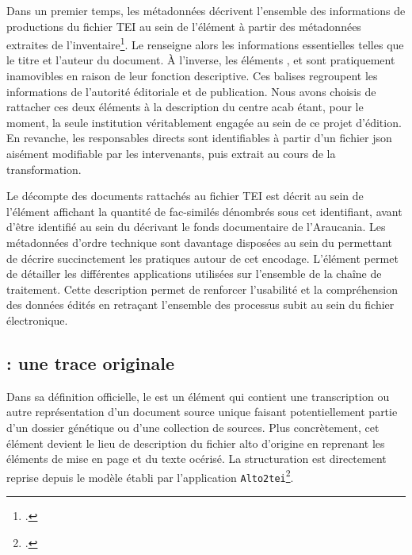 	Dans un premier temps, les métadonnées décrivent l'ensemble des informations de productions du fichier TEI au sein de l'élément  à partir des métadonnées extraites de l'inventaire\footcite[La structuration de l'arbre du  est disponible en suivant le chemin suivant : ./src/teiheader.py .][]{humeauTeiTransformation2022}. Le  renseigne alors les informations essentielles telles que le titre et l'auteur du document. À l’inverse, les éléments ,  et  sont pratiquement inamovibles en raison de leur fonction descriptive. Ces balises regroupent les informations de l'autorité éditoriale et de publication. Nous avons choisis de rattacher ces deux éléments à la description du centre \gls{acab} étant, pour le moment, la seule institution véritablement engagée au sein de ce projet d'édition. En revanche, les responsables directs sont identifiables à partir d'un fichier \gls{json} aisément modifiable par les intervenants, puis extrait au cours de la transformation. 
	
	Le décompte des documents rattachés au fichier TEI est décrit au sein de l'élément  affichant la quantité de fac-similés dénombrés sous cet identifiant, avant d'être identifié au sein du  décrivant le fonds documentaire de l'Araucania. Les métadonnées d'ordre technique sont davantage disposées au sein du  permettant de décrire succinctement les pratiques autour de cet encodage. L'élément  permet de détailler les différentes applications utilisées sur l'ensemble de la chaîne de traitement. Cette description permet de renforcer l'usabilité et la compréhension des données édités en retraçant l'ensemble des processus subit au sein du fichier électronique.

	\subsection{ : une trace originale}
	
	Dans sa définition officielle, le  est un élément qui contient une transcription ou autre représentation d'un document source unique faisant potentiellement partie d'un dossier génétique ou d'une collection de sources. Plus concrètement, cet élément devient le lieu de description du fichier \gls{alto} d'origine en reprenant les éléments de mise en page et du texte océrisé. La structuration est directement reprise depuis le modèle établi par l'application \texttt{Alto2tei}\footcite{christensenAlto2tei2022}.
	
